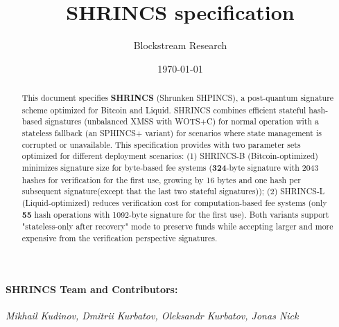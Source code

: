 \documentclass[10pt, a4paper]{article}
\title{SHRINCS specification}
\author{Blockstream Research}
\date{\today}
\begin{document}
\maketitle

\begin{abstract}
  This document specifies \textbf{SHRINCS} (Shrunken SHPINCS), a post-quantum signature scheme optimized for Bitcoin and Liquid. SHRINCS combines efficient stateful hash-based signatures (unbalanced XMSS with WOTS+C) for normal operation with a stateless fallback (an SPHINCS+ variant) for scenarios where state management is corrupted or unavailable. This specification provides with two parameter sets optimized for different deployment scenarios: (1) SHRINCS-B (Bitcoin-optimized) minimizes signature size for byte-based fee systems (\textbf{324}-byte signature with 2043 hashes for verification for the first use, growing by 16 bytes and one hash per subsequent signature(except that the last two stateful signatures)); (2) SHRINCS-L (Liquid-optimized) reduces verification cost for computation-based fee systems (only \textbf{55} hash operations with 1092-byte signature for the first use). Both variants support "stateless-only after recovery" mode to preserve funds while accepting larger and more expensive from the verification perspective signatures. 
\end{abstract}

\paragraph{SHRINCS Team and Contributors:}
\textit{Mikhail Kudinov, Dmitrii Kurbatov, Oleksandr Kurbatov, Jonas Nick}

\tableofcontents

\newpage























\printbibliography{}

\appendix


\end{document}
